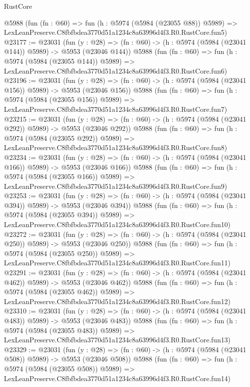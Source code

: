 \begin{lexlean}{RustCore}
\begin{coremodule}
    @5988
    (fun (fn : @60) =>
    fun (h : @5974 (@5984 (@23055 @88)) @5989) =>
    LexLeanPreserve.C8fbfbdea3770d51a1234c8a63996d4f3.R0.RustCore.fun5)
@23177 := @23031
    (fun (y : @28) => (fn : @60) -> (h : @5974 (@5984 (@23041 @144)) @5989) -> @5953 (@23046 @144))
    @5988
    (fun (fn : @60) =>
    fun (h : @5974 (@5984 (@23055 @144)) @5989) =>
    LexLeanPreserve.C8fbfbdea3770d51a1234c8a63996d4f3.R0.RustCore.fun6)
@23196 := @23031
    (fun (y : @28) => (fn : @60) -> (h : @5974 (@5984 (@23041 @156)) @5989) -> @5953 (@23046 @156))
    @5988
    (fun (fn : @60) =>
    fun (h : @5974 (@5984 (@23055 @156)) @5989) =>
    LexLeanPreserve.C8fbfbdea3770d51a1234c8a63996d4f3.R0.RustCore.fun7)
@23215 := @23031
    (fun (y : @28) => (fn : @60) -> (h : @5974 (@5984 (@23041 @292)) @5989) -> @5953 (@23046 @292))
    @5988
    (fun (fn : @60) =>
    fun (h : @5974 (@5984 (@23055 @292)) @5989) =>
    LexLeanPreserve.C8fbfbdea3770d51a1234c8a63996d4f3.R0.RustCore.fun8)
@23234 := @23031
    (fun (y : @28) => (fn : @60) -> (h : @5974 (@5984 (@23041 @166)) @5989) -> @5953 (@23046 @166))
    @5988
    (fun (fn : @60) =>
    fun (h : @5974 (@5984 (@23055 @166)) @5989) =>
    LexLeanPreserve.C8fbfbdea3770d51a1234c8a63996d4f3.R0.RustCore.fun9)
@23253 := @23031
    (fun (y : @28) => (fn : @60) -> (h : @5974 (@5984 (@23041 @394)) @5989) -> @5953 (@23046 @394))
    @5988
    (fun (fn : @60) =>
    fun (h : @5974 (@5984 (@23055 @394)) @5989) =>
    LexLeanPreserve.C8fbfbdea3770d51a1234c8a63996d4f3.R0.RustCore.fun10)
@23272 := @23031
    (fun (y : @28) => (fn : @60) -> (h : @5974 (@5984 (@23041 @250)) @5989) -> @5953 (@23046 @250))
    @5988
    (fun (fn : @60) =>
    fun (h : @5974 (@5984 (@23055 @250)) @5989) =>
    LexLeanPreserve.C8fbfbdea3770d51a1234c8a63996d4f3.R0.RustCore.fun11)
@23291 := @23031
    (fun (y : @28) => (fn : @60) -> (h : @5974 (@5984 (@23041 @462)) @5989) -> @5953 (@23046 @462))
    @5988
    (fun (fn : @60) =>
    fun (h : @5974 (@5984 (@23055 @462)) @5989) =>
    LexLeanPreserve.C8fbfbdea3770d51a1234c8a63996d4f3.R0.RustCore.fun12)
@23310 := @23031
    (fun (y : @28) => (fn : @60) -> (h : @5974 (@5984 (@23041 @483)) @5989) -> @5953 (@23046 @483))
    @5988
    (fun (fn : @60) =>
    fun (h : @5974 (@5984 (@23055 @483)) @5989) =>
    LexLeanPreserve.C8fbfbdea3770d51a1234c8a63996d4f3.R0.RustCore.fun13)
@23329 := @23031
    (fun (y : @28) => (fn : @60) -> (h : @5974 (@5984 (@23041 @508)) @5989) -> @5953 (@23046 @508))
    @5988
    (fun (fn : @60) =>
    fun (h : @5974 (@5984 (@23055 @508)) @5989) =>
    LexLeanPreserve.C8fbfbdea3770d51a1234c8a63996d4f3.R0.RustCore.fun14)

\end{coremodule}
\end{lexlean}
